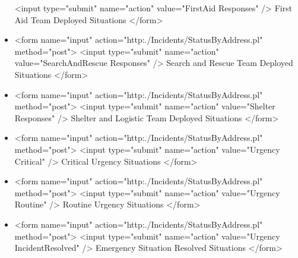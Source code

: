 \begin{itemize}
\begin{rawhtml}
 <input type="submit" name="action" value="FirstAid Responses" />
 First Aid Team Deployed Situations 
</form>
\end{rawhtml}
\item
\begin{rawhtml}
<form name="input" 
action="http:./Incidents/StatusByAddress.pl" method="post"> 
 <input type="submit" name="action" value="SearchAndRescue Responses" />
 Search and Rescue Team Deployed Situations 
</form>
\end{rawhtml}
\item
\begin{rawhtml}
<form name="input" 
action="http:./Incidents/StatusByAddress.pl" method="post"> 
 <input type="submit" name="action" value="Shelter Responses" />
 Shelter and Logistic Team Deployed Situations 
</form>
\end{rawhtml}
\item
\begin{rawhtml}
<form name="input" 
action="http:./Incidents/StatusByAddress.pl" method="post"> 
 <input type="submit" name="action" value="Urgency Critical" />
 Critical Urgency Situations 
</form>
\end{rawhtml}
\item
\begin{rawhtml}
<form name="input" 
action="http:./Incidents/StatusByAddress.pl" method="post"> 
 <input type="submit" name="action" value="Urgency Routine" />
 Routine  Urgency Situations 
</form>
\end{rawhtml}
\item
\begin{rawhtml}
<form name="input" 
action="http:./Incidents/StatusByAddress.pl" method="post"> 
 <input type="submit" name="action" value="Urgency IncidentResolved" />
 Emergency Situation Resolved  Situations 
</form>
\end{rawhtml}
\end{itemize}
